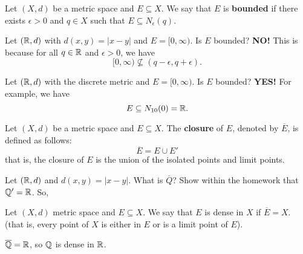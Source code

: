 \documentclass[a4paper]{report}
\begin{document}
\begin{definition}
    Let \( (X,d) \) be a metric space and \( E \subseteq  X \). We say that \( E  \) is \textbf{bounded} if there exists \( \epsilon >0    \) and \( q \in X  \) such that \( E \subseteq {N}_{\epsilon}(q) \).   
\end{definition}

\begin{eg}
    Let \( (\mathbb{R} , d ) \) with \( d(x,y) = | x - y  |  \) and \( E = [0,\infty ) \). Is \( E  \) bounded? \textbf{NO!} This is because for all \( q \in \mathbb{R}  \) and \( \epsilon > 0  \), we have
    \[  [0,\infty ) \not\subseteq (q - \epsilon, q + \epsilon).   \]
\end{eg}

\begin{eg}
    Let \( (\mathbb{R}, d) \) with the discrete metric and \( E = [0,\infty )  \). Is \( E  \) bounded? \textbf{YES!} For example, we have 
    \[  E \subseteq  {N}_{10}(0) = \mathbb{R}.  \]
\end{eg}

\begin{definition}[Closure]
    Let \( (X,d) \) be a metric space and \( E \subseteq X  \). The \textbf{closure} of \( E  \), denoted by \( \overline{E} \), is defined as follows:  
    \[ \overline{E} = E \cup E' \]
    that is, the closure of \( E  \) is the union of the isolated points and limit points.
\end{definition}

\begin{eg}
   Let \( (\mathbb{R},d) \) and \( d(x,y) = | x - y  |  \). What is \( \overline{Q} \)? Show within the homework that \( \mathbb{Q}' = \mathbb{R}  \). So,  
   \[   \]
\end{eg}

\begin{definition}[Dense]
    Let \( (X,d) \) metric space and \( E \subseteq X  \). We say that \( E  \) is dense in \( X  \) if \( \overline{E} = X  \). (that is, every point of \( X  \) is either in \( E  \) or is a limit point of \( E  \)).
\end{definition} 

\begin{eg}
    \( \overline{\mathbb{Q}} = \mathbb{R}    \), so \( \mathbb{Q} \) is dense in \( \mathbb{R}  \). 
\end{eg}
\end{document}
